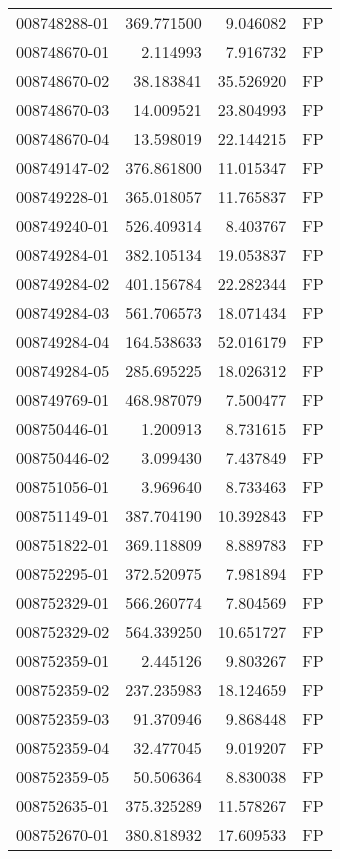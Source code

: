 \begin{tabular}{lrrl}
008748288-01 &  369.771500 &     9.046082 &   FP \\
008748670-01 &    2.114993 &     7.916732 &   FP \\
008748670-02 &   38.183841 &    35.526920 &   FP \\
008748670-03 &   14.009521 &    23.804993 &   FP \\
008748670-04 &   13.598019 &    22.144215 &   FP \\
008749147-02 &  376.861800 &    11.015347 &   FP \\
008749228-01 &  365.018057 &    11.765837 &   FP \\
008749240-01 &  526.409314 &     8.403767 &   FP \\
008749284-01 &  382.105134 &    19.053837 &   FP \\
008749284-02 &  401.156784 &    22.282344 &   FP \\
008749284-03 &  561.706573 &    18.071434 &   FP \\
008749284-04 &  164.538633 &    52.016179 &   FP \\
008749284-05 &  285.695225 &    18.026312 &   FP \\
008749769-01 &  468.987079 &     7.500477 &   FP \\
008750446-01 &    1.200913 &     8.731615 &   FP \\
008750446-02 &    3.099430 &     7.437849 &   FP \\
008751056-01 &    3.969640 &     8.733463 &   FP \\
008751149-01 &  387.704190 &    10.392843 &   FP \\
008751822-01 &  369.118809 &     8.889783 &   FP \\
008752295-01 &  372.520975 &     7.981894 &   FP \\
008752329-01 &  566.260774 &     7.804569 &   FP \\
008752329-02 &  564.339250 &    10.651727 &   FP \\
008752359-01 &    2.445126 &     9.803267 &   FP \\
008752359-02 &  237.235983 &    18.124659 &   FP \\
008752359-03 &   91.370946 &     9.868448 &   FP \\
008752359-04 &   32.477045 &     9.019207 &   FP \\
008752359-05 &   50.506364 &     8.830038 &   FP \\
008752635-01 &  375.325289 &    11.578267 &   FP \\
008752670-01 &  380.818932 &    17.609533 &   FP \\

\end{tabular}
